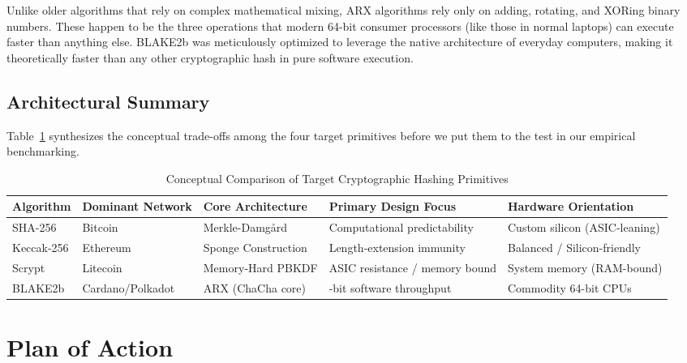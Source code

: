 \documentclass[11pt,a4paper,oneside]{book}
\begin{document}
Unlike older algorithms that rely on complex mathematical mixing, ARX algorithms rely only on adding, rotating, and XORing binary numbers. These happen to be the three operations that modern 64-bit consumer processors (like those in normal laptops) can execute faster than anything else. BLAKE2b was meticulously optimized to leverage the native architecture of everyday computers, making it theoretically faster than any other cryptographic hash in pure software execution.

\section{Architectural Summary}
Table~\ref{tab:lit_comparison} synthesizes the conceptual trade-offs among the four target primitives before we put them to the test in our empirical benchmarking.

\begin{table}[H]
    \centering
    \caption{Conceptual Comparison of Target Cryptographic Hashing Primitives}
    \label{tab:lit_comparison}
    \vspace{0.4em}
    \small
    \begin{tabularx}{\textwidth}{@{}l l l >{\raggedright\arraybackslash}X >{\raggedright\arraybackslash}X@{}}
        \toprule
        \textbf{Algorithm} & \textbf{Dominant Network} & \textbf{Core Architecture} & \textbf{Primary Design Focus}  & \textbf{Hardware Orientation} \\
        \midrule
        SHA-256            & Bitcoin                   & Merkle-Damg{\aa}rd         & Computational predictability   & Custom silicon (ASIC-leaning) \\
        Keccak-256         & Ethereum                  & Sponge Construction        & Length-extension immunity      & Balanced / Silicon-friendly   \\
        Scrypt             & Litecoin                  & Memory-Hard PBKDF          & ASIC resistance / memory bound & System memory (RAM-bound)     \\
        BLAKE2b            & Cardano/Polkadot          & ARX (ChaCha core)          & 64-bit software throughput     & Commodity 64-bit CPUs         \\
        \bottomrule
    \end{tabularx}
\end{table}


\chapter{Plan of Action}
\end{document}
